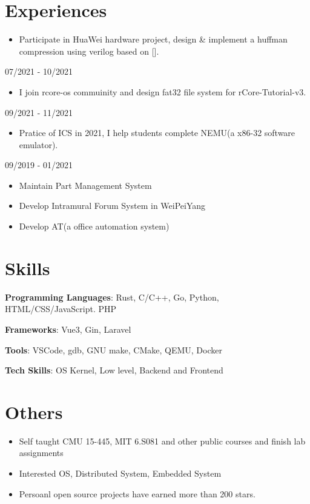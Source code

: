\documentclass{chicv}
\begin{document}
\section{Experiences}
\begin{itemize}
  \item Participate in HuaWei hardware project, design \& implement a huffman compression using verilog based on [].
\end{itemize}
{07/2021 - 10/2021}
\begin{itemize}
  \item I join rcore-os commuinity and design fat32 file system for rCore-Tutorial-v3.
\end{itemize}

{09/2021 - 11/2021}
\begin{itemize}
  \item Pratice of ICS in 2021, I help students complete NEMU(a x86-32 software emulator).
\end{itemize}

{09/2019 - 01/2021}
\begin{itemize}
  \item Maintain Part Management System 
  \item Develop Intramural Forum System in WeiPeiYang
  \item Develop AT(a office automation system)
\end{itemize}



\section{Skills}

\begin{compactlist}
  \item \textbf{Programming Languages}: Rust, C/C++, Go, Python, HTML/CSS/JavaScript. PHP
  \item \textbf{Frameworks}: Vue3, Gin, Laravel
  \item \textbf{Tools}: VSCode, gdb, GNU make, CMake, QEMU, Docker
  \item \textbf{Tech Skills}: OS Kernel, Low level, Backend and Frontend
\end{compactlist}

\section{Others}
\begin{itemize}
  \item Self taught CMU 15-445, MIT 6.S081 and other public courses and finish lab assignments 
  \item Interested OS, Distributed System, Embedded System 
  \item Persoanl open source projects have earned more than 200 stars.
\end{itemize}
\end{document}
